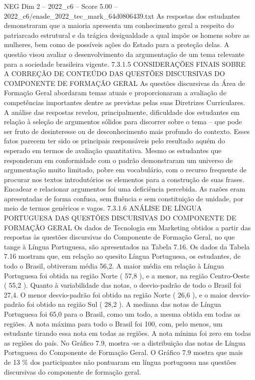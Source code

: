 \begin{textsample}{NEG Dim 2 – 2022\_c6 – Score 5.00 – 2022\_c6/enade\_2022\_tec\_mark\_64d0806439.txt}
As respostas dos estudantes demonstraram que a maioria apresenta um conhecimento geral a respeito do patriarcado estrutural e da trágica desigualdade a qual impõe os homens sobre as mulheres, bem como de possíveis ações do Estado para a proteção delas.
A questão visou avaliar o desenvolvimento da argumentação de um tema relevante para a sociedade brasileira vigente. 7.3.1.5 CONSIDERAÇÕES FINAIS SOBRE A CORREÇÃO DE CONTEÚDO DAS QUESTÕES DISCURSIVAS DO COMPONENTE DE FORMAÇÃO GERAL As questões discursivas da Área de Formação Geral abordaram temas atuais e proporcionaram a avaliação de competências importantes dentre as previstas pelas suas Diretrizes Curriculares.
A análise das respostas revelou, principalmente, dificuldade dos estudantes em relação à seleção de argumentos sólidos para discorrer sobre o tema – que pode ser fruto de desinteresse ou de desconhecimento mais profundo do contexto.
Esses fatos parecem ter sido os principais responsáveis pelo resultado aquém do esperado em termos de avaliação quantitativa.
Mesmo os estudantes que responderam em conformidade com o padrão demonstraram um universo de argumentação muito limitado, pobre em vocabulário, com o recurso frequente de procurar nos textos introdutórios os elementos para a construção de suas frases.
Encadear e relacionar argumentos foi uma deficiência percebida.
As razões eram apresentadas de forma confusa, sem fluência e sem constituição de unidade, por meio de termos genéricos e vagos. 7.3.1.6 ANÁLISE DE LÍNGUA PORTUGUESA DAS QUESTÕES DISCURSIVAS DO COMPONENTE DE FORMAÇÃO GERAL Os dados de Tecnologia em Marketing obtidos a partir das respostas às questões discursivas do Componente de Formação Geral, no que tange à Língua Portuguesa, são apresentados na Tabela 7.16.
Os dados da Tabela 7.16 mostram que, em relação ao quesito Língua Portuguesa, os estudantes, de todo o Brasil, obtiveram média 56,2.
A maior média em relação à Língua Portuguesa foi obtida na região Norte ( 57,8 ), e a menor, na região Centro-Oeste ( 55,2 ).
Quanto à variabilidade das notas, o desvio-padrão de todo o Brasil foi 27,4.
O menor desvio-padrão foi obtido na região Norte ( 26,6 ), e o maior desvio-padrão foi obtido na região Sul ( 28,2 ).
A mediana das notas de Língua Portuguesa foi 65,0 para o Brasil, como um todo, a mesma obtida em todas as regiões.
A nota máxima para todo o Brasil foi 100, com, pelo menos, um estudante tirando essa nota em todas as regiões.
A nota mínima foi zero em todas as regiões do país.
No Gráfico 7.9, mostra -se a distribuição das notas de Língua Portuguesa do Componente de Formação Geral.
O Gráfico 7.9 mostra que mais de 13 \% dos participantes não pontuaram em língua portuguesa nas questões discursivas do componente de formação geral.

\end{textsample}

